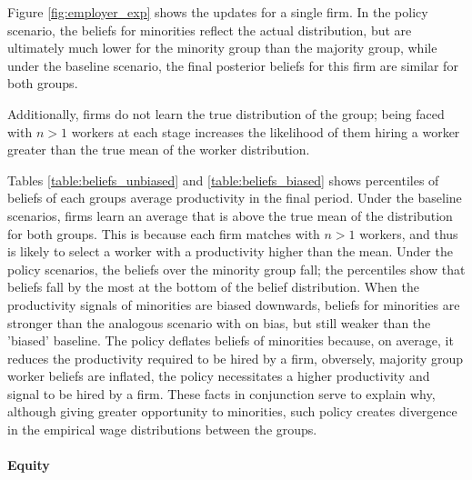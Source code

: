 \documentclass[]{article}
\begin{document}
Figure \ref{fig:employer_exp} shows the updates for a single firm. In the policy scenario, the beliefs for minorities reflect the actual distribution, but are ultimately much lower for the minority group than the majority group, while under the baseline scenario, the final posterior beliefs for this firm are similar for both groups.

Additionally, firms do not learn the true distribution of the group; being faced with $n > 1$ workers at each stage increases the likelihood of them hiring a worker greater than the true mean of the worker distribution. 




Tables \ref{table:beliefs_unbiased} and \ref{table:beliefs_biased} shows percentiles of beliefs of each groups average productivity in the final period. Under the baseline scenarios, firms learn an average that is above the true mean of the distribution for both groups. This is because each firm matches with $n>1$ workers, and thus is likely to select a worker with a productivity higher than the mean. Under the policy scenarios, the beliefs over the minority group fall; the percentiles show that beliefs fall by the most at the bottom of the belief distribution. When the productivity signals of minorities are biased downwards, beliefs for minorities are stronger than the analogous scenario with on bias, but still weaker than the 'biased' baseline. The policy deflates beliefs of minorities because, on average, it reduces the productivity required to be hired by a firm, obversely, majority group worker beliefs are inflated, the policy necessitates a higher productivity and signal to be hired by a firm. These facts in conjunction serve to explain why, although giving greater opportunity to minorities, such policy creates divergence in the empirical wage distributions between the groups.
\newpage
\paragraph*{Equity}
\end{document}
